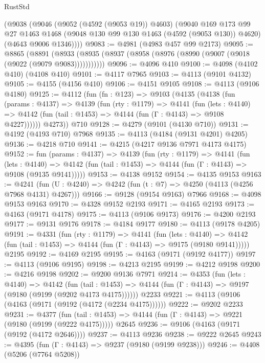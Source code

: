 \begin{lexlean}{RustStd}
\begin{coremodule}
    (@9038
      (@9046
        (@9052 (@4592 (@9053 @19)) @4603)
        (@9040
          @169
          @173
          @99
          @27
          @1463
          @1468
          (@9048 @130 @99 @130 @1463 (@4592 (@9053 @130)) @4620)
          (@4643 @9006 @1346))))
@9083 := @4981 (@4983 @457 @99 @2173)
@9095 := @8865
    (@8891 (@8933 (@8935 (@8937 (@8958 (@8976 (@8990 (@9007 (@9018 (@9022 (@9079 @9083)))))))))))
@9096 := @4096 @410
@9100 := @4098 (@4102 @410) (@4108 @410)
@9101 := @4117 @7965
@9103 := @4113 (@9101 @4132)
@9105 := @4155 (@4156 @410)
@9106 := @4151 @9105
@9108 := @4113 (@9106 @4180)
@9125 := @4112
    (fun (fn : @123) =>
    @9103
      (@4135
        (@4138
          (fun (params : @4137) =>
          @4139
            (fun (rty : @1179) =>
            @4141
              (fun (lets : @4140) =>
              @4142 (fun (tail : @1453) => @4144 (fun (Γ : @4143) => @9108 @4227))))))
        @4273))
    @710
@9128 := @4279 (@9101 (@4130 @710))
@9131 := @4192 (@4193 @710) @7968
@9135 := @4113 (@4184 (@9131 @4201) @4205)
@9136 := @4218 @710
@9141 := @4215 (@4217 @9136 @7971 @4173 @4175)
@9152 := fun (params : @4137) =>
  @4139
    (fun (rty : @1179) =>
    @4141
      (fun (lets : @4140) =>
      @4142 (fun (tail : @1453) => @4144 (fun (Γ : @4143) => @9108 (@9135 @9141)))))
@9153 := @4138 @9152
@9154 := @4135 @9153
@9163 := @4241 (fun (U : @4240) => @4242 (fun (t : @7) => @4250 (@4113 (@4256 @7968 @4131) @4267)))
@9166 := @9128 (@9154 @9163) @7966
@9168 := @4098 @9153 @9163
@9170 := @4328 @9152 @2193
@9171 := @4165 @2193
@9173 := @4163 (@9171 @4178)
@9175 := @4113 (@9106 @9173)
@9176 := @4200 @2193
@9177 := @9131 @9176
@9178 := @4184 @9177
@9180 := @4113 (@9178 @4205)
@9191 := @4331
    (fun (rty : @1179) =>
    @4141
      (fun (lets : @4140) =>
      @4142 (fun (tail : @1453) => @4144 (fun (Γ : @4143) => @9175 (@9180 @9141)))))
    @2195
@9192 := @4169 @2195
@9195 := @4163 (@9171 (@9192 @4177))
@9197 := @4113 (@9106 @9195)
@9198 := @4213 @2195
@9199 := @4212 @9198
@9200 := @4216 @9198
@9202 := @9200 @9136 @7971
@9214 := @4353
    (fun (lets : @4140) =>
    @4142
      (fun (tail : @1453) => @4144 (fun (Γ : @4143) => @9197 (@9180 (@9199 (@9202 @4173 @4175))))))
    @2233
@9221 := @4113 (@9106 (@4163 (@9171 (@9192 (@4172 (@2234 @4175))))))
@9222 := @9202 @2233
@9231 := @4377
    (fun (tail : @1453) => @4144 (fun (Γ : @4143) => @9221 (@9180 (@9199 (@9222 @4175)))))
    @2645
@9236 := @9106 (@4163 (@9171 (@9192 (@4172 @2646))))
@9237 := @4113 @9236
@9238 := @9222 @2645
@9243 := @4395 (fun (Γ : @4143) => @9237 (@9180 (@9199 @9238)))
@9246 := @4408 (@5206 (@7764 @5208))

\end{coremodule}
\end{lexlean}
